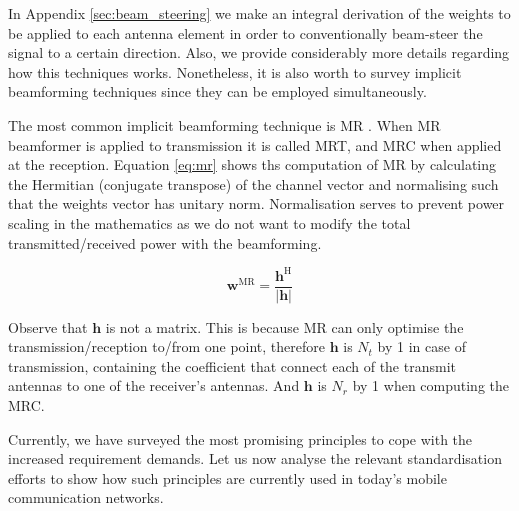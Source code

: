 
In Appendix \ref{sec:beam_steering} we make an integral derivation of the weights to be applied to each antenna element in order to conventionally beam-steer the signal to a certain direction. Also, we provide considerably more details regarding how this techniques works. Nonetheless, it is also worth to survey implicit beamforming techniques since they can be employed simultaneously.

The most common implicit beamforming technique is \ac{MR} \cite{795811}. When \ac{MR} beamformer is applied to transmission it is called \ac{MRT}, and \ac{MRC} when applied at the reception. Equation \ref{eq:mr} shows ths computation of \ac{MR} by calculating the Hermitian (conjugate transpose) of the channel vector and normalising such that the weights vector has unitary norm. Normalisation serves to prevent power scaling in the mathematics as we do not want to modify the total transmitted/received power with the beamforming.

\begin{equation} \label{eq:mr}
    \bm{w}^\text{MR} = \frac{\bm{h}^\text{H}}{|\bm{h}|}
\end{equation}

Observe that $\bm{h}$ is not a matrix. This is because \ac{MR} can only optimise the transmission/reception to/from one point, therefore $\bm{h}$ is $N_t$ by 1 in case of transmission, containing the coefficient that connect each of the transmit antennas to one of the receiver's antennas. And $\bm{h}$ is $N_r$ by 1 when computing the \ac{MRC}.

Currently, we have surveyed the most promising principles to cope with the increased requirement demands. Let us now analyse the relevant standardisation efforts to show how such principles are currently used in today's mobile communication networks.
